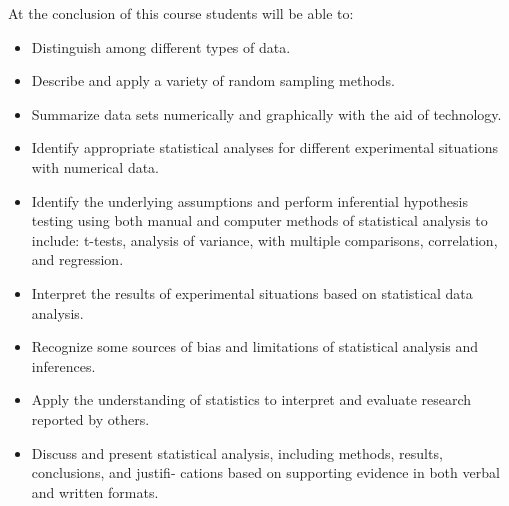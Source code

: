 At the conclusion of this course students will be able to:

\begin{itemize}
	\item Distinguish among different types of data.
	\item Describe and apply a variety of random sampling methods.
	\item Summarize data sets numerically and graphically with the aid of technology.
	\item Identify appropriate statistical analyses for different experimental situations with numerical data.
	\item Identify the underlying assumptions and perform inferential hypothesis testing using both manual and computer methods of statistical analysis to include: t-tests, analysis of variance, with multiple comparisons, correlation, and regression.
		\item
Interpret the results of experimental situations based on statistical data analysis. 
	\item Recognize some sources of bias and limitations of statistical analysis and inferences.
	\item Apply the understanding of statistics to interpret and evaluate research reported by others.
	\item Discuss and present statistical analysis, including methods, results, conclusions, and justifi- cations based on supporting evidence in both verbal and written formats.

\end{itemize}